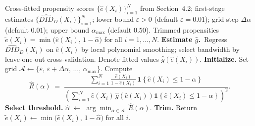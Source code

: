 \begin{algorithm}[H]
\caption{Data-driven trimming threshold selection. Takes the cross-fitted propensity scores and first-stage estimates already computed for the DML estimator and returns trimmed propensities $\tilde e(X_i)=\min(\hat e(X_i),1-\hat\alpha)$ for use in the final GMM step.}
\label{alg:trimming}
\begin{algorithmic}[1]
\Require Cross-fitted propensity scores $\{\hat e(X_i)\}_{i=1}^N$ from Section~4.2;
         first-stage estimates $\{\widehat{DID}_D(X_i)\}_{i=1}^N$;
         lower bound $\varepsilon > 0$ (default $\varepsilon = 0.01$);
         grid step $\Delta\alpha$ (default $0.01$);
         upper bound $\alpha_{\max}$ (default $0.50$).
\Ensure Trimmed propensities $\tilde e(X_i) = \min\!\bigl(\hat e(X_i),\,1 - \hat\alpha\bigr)$ for all $i=1,\ldots,N$.
\State \textbf{Estimate $\hat g$.} \,Regress $\widehat{DID}_D(X_i)$ on $\hat e(X_i)$ by local polynomial smoothing; select bandwidth by leave-one-out cross-validation. Denote fitted values $\hat g(\hat e(X_i))$.
\State \textbf{Initialize.} Set grid $\mathcal{A} \leftarrow \{\varepsilon,\,\varepsilon + \Delta\alpha,\,\ldots,\,\alpha_{\max}\}$.
  \State Compute
  \[
    \hat R(\alpha) \;=\;
    \frac{\displaystyle\sum_{i=1}^{N}
          \frac{\hat e(X_i)}{1-\hat e(X_i)}\,
          \mathbf{1}\!\left\{\hat e(X_i)\le 1-\alpha\right\}}
         {\displaystyle\left(\sum_{i=1}^{N}
          \hat e(X_i)\,\hat g\!\left(\hat e(X_i)\right)
          \mathbf{1}\!\left\{\hat e(X_i)\le 1-\alpha\right\}\right)^{\!2}}.
  \]
\EndFor
\State \textbf{Select threshold.} $\hat\alpha \;\leftarrow\; \arg\min_{\alpha\in\mathcal{A}}\,\hat R(\alpha)$.
\State \textbf{Trim.} Return $\tilde e(X_i) \leftarrow \min\!\bigl(\hat e(X_i),\,1-\hat\alpha\bigr)$ for all $i$.
\end{algorithmic}
\end{algorithm}

\FloatBarrier

